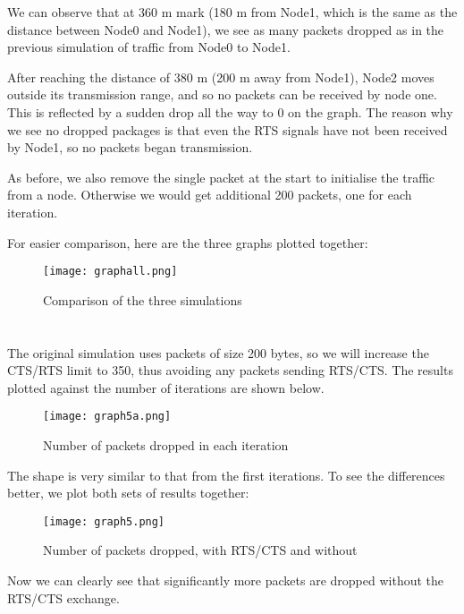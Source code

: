 \documentclass[11pt,journal]{article}
\begin{document}
	We can observe that at 360 m mark (180 m from Node1, which is the same as the distance between Node0 and Node1), we see as many packets dropped as in the previous simulation of traffic from Node0 to Node1.
	
	After reaching the distance of 380 m (200 m away from Node1), Node2 moves outside its transmission range, and so no packets can be received by node one. This is reflected by a sudden drop all the way to 0 on the graph. The reason why we see no dropped packages is that even the RTS signals have not been received by Node1, so no packets began transmission.

	As before, we also remove the single packet at the start to initialise the traffic from a node. Otherwise we would get additional 200 packets, one for each iteration.

	\pagebreak
	
	For easier comparison, here are the three graphs plotted together:
		\begin{figure}[h]
			\centering
			\texttt{[image: graphall.png]}
			\caption{Comparison of the three simulations}
		\end{figure}
	
	\pagebreak
	\section{}
	The original simulation uses packets of size 200 bytes, so we will increase the CTS/RTS limit to 350, thus avoiding any packets sending RTS/CTS. The results plotted against the number of iterations are shown below.
	
	\begin{figure}[h]
		\centering
		\texttt{[image: graph5a.png]}
		\caption{Number of packets dropped in each iteration}
	\end{figure}

	The shape is very similar to that from the first iterations. To see the differences better, we plot both sets of results together:
	
	\begin{figure}[h]
		\centering
		\texttt{[image: graph5.png]}
		\caption{Number of packets dropped, with RTS/CTS and without}
	\end{figure}

	Now we can clearly see that significantly more packets are dropped without the RTS/CTS exchange.
	
	
	
	
	

	
\end{document}

